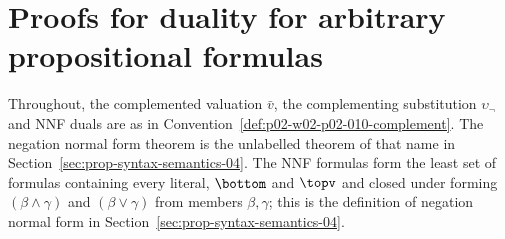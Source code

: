 \section{Proofs for duality for arbitrary propositional formulas}
\label{sec:annex-p02-w02-p02-010-duality-arbitrary}

Throughout, the complemented valuation \(\bar v\), the complementing
substitution \(\upsilon_{\neg}\) and NNF duals are as in
Convention~\ref{def:p02-w02-p02-010-complement}.  The negation normal form
theorem is the unlabelled theorem of that name in
Section~\ref{sec:prop-syntax-semantics-04}.  The NNF formulas form the least
set of formulas containing every literal, \(\bottom\) and \(\topv\) and closed
under forming \((\beta\land\gamma)\) and \((\beta\lor\gamma)\) from members
\(\beta,\gamma\); this is the definition of negation normal form in
Section~\ref{sec:prop-syntax-semantics-04}.


